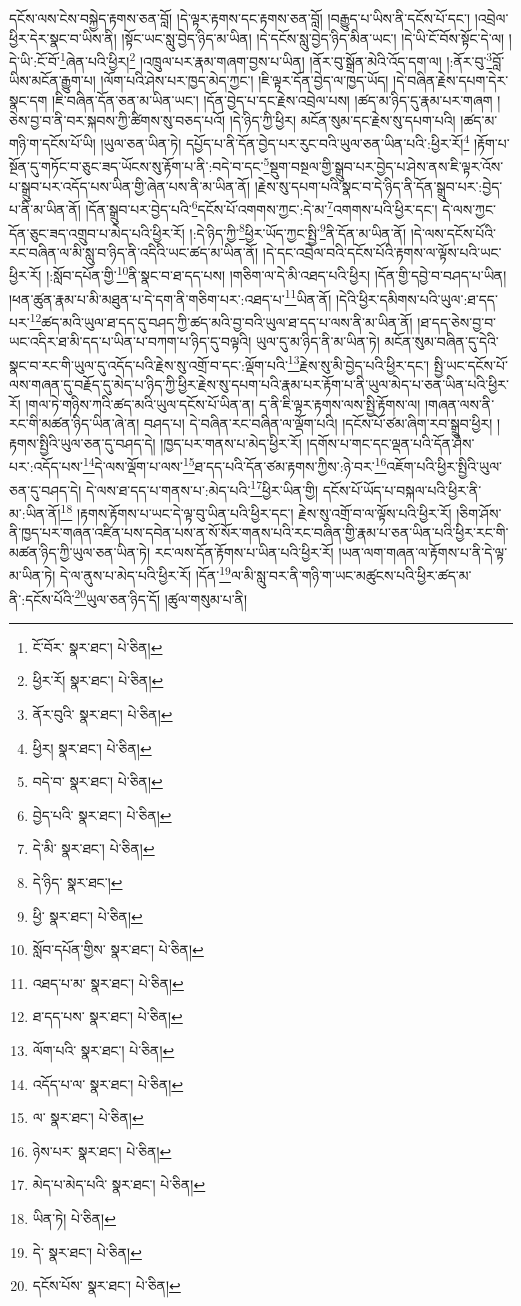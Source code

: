 དངོས་ལས་ངེས་བསྐྱེད་རྟགས་ཅན་བློ། །དེ་ལྟར་རྟགས་དང་རྟགས་ཅན་བློ། །བརྒྱུད་པ་ཡིས་ནི་དངོས་པོ་དང་། །འབྲེལ་ཕྱིར་དེར་སྣང་བ་ཡིས་ནི། །སྟོང་ཡང་སླུ་བྱེད་ཉིད་མ་ཡིན། །དེ་དངོས་སླུ་བྱེད་ཉིད་མིན་ཡང་། །དེ་ཡི་ངོ་བོས་སྟོང་དེ་ལ། །དེ་ཡི་:ངོ་བོ་\footnote{ངོ་བོར་  སྣར་ཐང་།  པེ་ཅིན། }ཞེན་པའི་ཕྱིར།\footnote{ཕྱིར་རོ།  སྣར་ཐང་།  པེ་ཅིན། } །འཁྲུལ་པར་རྣམ་གཞག་བྱས་པ་ཡིན། །ནོར་བུ་སྒྲོན་མེའི་འོད་དག་ལ། །:ནོར་བུ་\footnote{ནོར་བུའི་  སྣར་ཐང་།  པེ་ཅིན། }བློ་ཡིས་མངོན་རྒྱུག་པ། །ལོག་པའི་ཤེས་པར་ཁྱད་མེད་ཀྱང་། །ཇི་ལྟར་དོན་བྱེད་ལ་ཁྱད་ཡོད། །དེ་བཞིན་རྗེས་དཔག་དེར་སྣང་དག །ཇི་བཞིན་དོན་ཅན་མ་ཡིན་ཡང་། །དོན་བྱེད་པ་དང་རྗེས་འབྲེལ་པས། །ཚད་མ་ཉིད་དུ་རྣམ་པར་གཞག །ཅེས་བྱ་བ་ནི་བར་སྐབས་ཀྱི་ཚིགས་སུ་བཅད་པའོ། །དེ་ཉིད་ཀྱི་ཕྱིར། མངོན་སུམ་དང་རྗེས་སུ་དཔག་པའི། །ཚད་མ་གཉི་ག་དངོས་པོ་ཡི། །ཡུལ་ཅན་ཡིན་ཏེ། དཔྱོད་པ་ནི་དོན་བྱེད་པར་རུང་བའི་ཡུལ་ཅན་ཡིན་པའི་:ཕྱིར་རོ།\footnote{ཕྱིར།  སྣར་ཐང་།  པེ་ཅིན། } །རྟོག་པ་སྔོན་དུ་གཏོང་བ་ཅུང་ཟད་ཡོངས་སུ་རྟོག་པ་ནི་:བདེ་བ་དང་\footnote{བདེ་བ་  སྣར་ཐང་།  པེ་ཅིན། }སྡུག་བསྔལ་གྱི་སྒྲུབ་པར་བྱེད་པ་ཤེས་ནས་ཇི་ལྟར་འོས་པ་སྒྲུབ་པར་འདོད་པས་ཡིན་གྱི་ཞེན་པས་ནི་མ་ཡིན་ནོ། །རྗེས་སུ་དཔག་པའི་སྣང་བ་དེ་ཉིད་ནི་དོན་སྒྲུབ་པར་:བྱེད་པ་ནི་མ་ཡིན་ནོ། །དོན་སྒྲུབ་པར་བྱེད་པའི་\footnote{བྱེད་པའི་  སྣར་ཐང་།  པེ་ཅིན། }དངོས་པོ་འགགས་ཀྱང་:དེ་མ་\footnote{དེ་མི་  སྣར་ཐང་།  པེ་ཅིན། }འགགས་པའི་ཕྱིར་དང་། དེ་ལས་ཀྱང་དོན་ཅུང་ཟད་འགྲུབ་པ་མེད་པའི་ཕྱིར་རོ། །:དེ་ཉིད་ཀྱི་\footnote{དེ་ཉིད་  སྣར་ཐང་། }ཕྱིར་ཡོད་ཀྱང་སྤྱི་\footnote{ཕྱི་  སྣར་ཐང་།  པེ་ཅིན། }ནི་དོན་མ་ཡིན་ནོ། །དེ་ལས་དངོས་པོའི་རང་བཞིན་ལ་མི་སླུ་བ་ཉིད་ནི་འདིའི་ཡང་ཚད་མ་ཡིན་ནོ། །དེ་དང་འབྲེལ་བའི་དངོས་པོའི་རྟགས་ལ་ལྟོས་པའི་ཡང་ཕྱིར་རོ། །:སློབ་དཔོན་གྱི་\footnote{སློབ་དཔོན་གྱིས་  སྣར་ཐང་།  པེ་ཅིན། }ནི་སྣང་བ་ཐ་དད་པས། །གཅིག་ལ་དེ་མི་འཐད་པའི་ཕྱིར། །དོན་གྱི་དབྱེ་བ་བཤད་པ་ཡིན། །ཕན་ཚུན་རྣམ་པ་མི་མཐུན་པ་དེ་དག་ནི་གཅིག་པར་:འཐད་པ་\footnote{འཐད་པ་མ་  སྣར་ཐང་།  པེ་ཅིན། }ཡིན་ནོ། །དེའི་ཕྱིར་དམིགས་པའི་ཡུལ་:ཐ་དད་པར་\footnote{ཐ་དད་པས་  སྣར་ཐང་།  པེ་ཅིན། }ཚད་མའི་ཡུལ་ཐ་དད་དུ་བཤད་ཀྱི་ཚད་མའི་བྱ་བའི་ཡུལ་ཐ་དད་པ་ལས་ནི་མ་ཡིན་ནོ། །ཐ་དད་ཅེས་བྱ་བ་ཡང་འདིར་ཐ་མི་དད་པ་ཡིན་པ་བཀག་པ་ཉིད་དུ་བལྟའི། ཡུལ་དུ་མ་ཉིད་ནི་མ་ཡིན་ཏེ། མངོན་སུམ་བཞིན་དུ་དེའི་སྣང་བ་རང་གི་ཡུལ་དུ་འདོད་པའི་རྗེས་སུ་འགྲོ་བ་དང་:ལྡོག་པའི་\footnote{ལོག་པའི་  སྣར་ཐང་།  པེ་ཅིན། }རྗེས་སུ་མི་བྱེད་པའི་ཕྱིར་དང་། སྤྱི་ཡང་དངོས་པོ་ལས་གཞན་དུ་བརྗོད་དུ་མེད་པ་ཉིད་ཀྱི་ཕྱིར་རྗེས་སུ་དཔག་པའི་རྣམ་པར་རྟོག་པ་ནི་ཡུལ་མེད་པ་ཅན་ཡིན་པའི་ཕྱིར་རོ། །གལ་ཏེ་གཉིས་ཀའི་ཚད་མའི་ཡུལ་དངོས་པོ་ཡིན་ན། ད་ནི་ཇི་ལྟར་རྟགས་ལས་སྤྱི་རྟོགས་ལ། །གཞན་ལས་ནི་རང་གི་མཚན་ཉིད་ཡིན་ཞེ་ན། བཤད་པ། དེ་བཞིན་རང་བཞིན་ལ་ལྡོག་པའི། །དངོས་པོ་ཙམ་ཞིག་རབ་སྒྲུབ་ཕྱིར། །རྟགས་སྤྱིའི་ཡུལ་ཅན་དུ་བཤད་དེ། །ཁྱད་པར་གནས་པ་མེད་ཕྱིར་རོ། །དགོས་པ་གང་དང་ལྡན་པའི་དོན་ཤེས་པར་:འདོད་པས་\footnote{འདོད་པ་ལ་  སྣར་ཐང་།  པེ་ཅིན། }དེ་ལས་ལྡོག་པ་ལས་\footnote{ལ་  སྣར་ཐང་།  པེ་ཅིན། }ཐ་དད་པའི་དོན་ཙམ་རྟགས་ཀྱིས་:ཉེ་བར་\footnote{ཉེས་པར་  སྣར་ཐང་།  པེ་ཅིན། }འཇོག་པའི་ཕྱིར་སྤྱིའི་ཡུལ་ཅན་དུ་བཤད་དེ། དེ་ལས་ཐ་དད་པ་གནས་པ་:མེད་པའི་\footnote{མེད་པ་མེད་པའི་  སྣར་ཐང་།  པེ་ཅིན། }ཕྱིར་ཡིན་གྱི། དངོས་པོ་ཡོད་པ་བསྐལ་པའི་ཕྱིར་ནི་མ་:ཡིན་ནོ།\footnote{ཡིན་ཏེ།  པེ་ཅིན། } །རྟགས་རྟོགས་པ་ཡང་དེ་ལྟ་བུ་ཡིན་པའི་ཕྱིར་དང་། རྗེས་སུ་འགྲོ་བ་ལ་ལྟོས་པའི་ཕྱིར་རོ། །ཅིག་ཤོས་ནི་ཁྱད་པར་གཞན་འཛིན་པས་དབེན་པས་ན་སོ་སོར་གནས་པའི་རང་བཞིན་གྱི་རྣམ་པ་ཅན་ཡིན་པའི་ཕྱིར་རང་གི་མཚན་ཉིད་ཀྱི་ཡུལ་ཅན་ཡིན་ཏེ། རང་ལས་དོན་རྟོགས་པ་ཡིན་པའི་ཕྱིར་རོ། །ཡན་ལག་གཞན་ལ་རྟོགས་པ་ནི་དེ་ལྟ་མ་ཡིན་ཏེ། དེ་ལ་ནུས་པ་མེད་པའི་ཕྱིར་རོ། །དོན་\footnote{དེ་  སྣར་ཐང་།  པེ་ཅིན། }ལ་མི་སླུ་བར་ནི་གཉི་ག་ཡང་མཚུངས་པའི་ཕྱིར་ཚད་མ་ནི་:དངོས་པོའི་\footnote{དངོས་པོས་  སྣར་ཐང་།  པེ་ཅིན། }ཡུལ་ཅན་ཉིད་དོ། །ཚུལ་གསུམ་པ་ནི། 